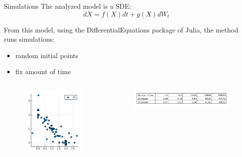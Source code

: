 \documentclass{beamer}
\begin{document}
\begin{frame}{Simulations}
The analyzed model is a SDE:
\[ dX = f(X)dt + g(X)dW_{t}\]

From this model, using the DifferentialEquations package of Julia, the method runs simulations: 
\begin{itemize}
\item random initial points
\item fix amount of time
\end{itemize}

\begin{columns}
\begin{column}{0.35\textwidth}
\begin{figure}
\includegraphics[width=\textwidth]{simplot.PNG}
\end{figure}
\end{column}
\begin{column}{0.65\textwidth}  %
\begin{figure}
\includegraphics[width=\textwidth]{tabletimesim.PNG}
\end{figure}
\end{column}
\end{columns}
\end{frame}
\end{document}
